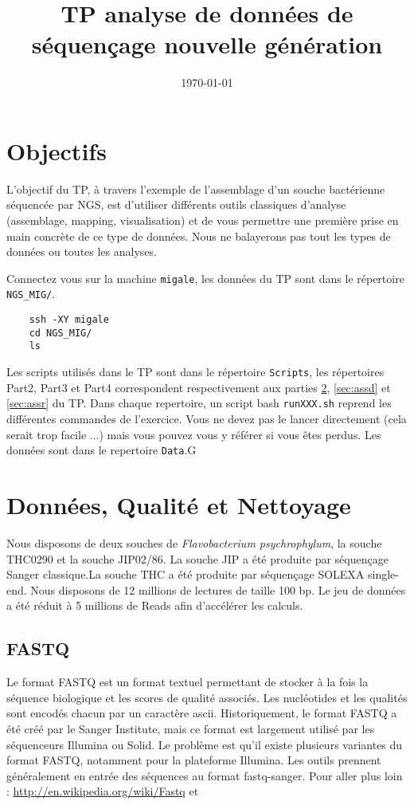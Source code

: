 \documentclass[a4paper,12pt]{article}
\title{TP analyse de données de séquençage nouvelle génération}
\date{\today}
\begin{document}
 

\maketitle 
\section{Objectifs} 
L'objectif du TP, à travers l'exemple de l'assemblage d'un souche bactérienne séquencée par NGS, est d'utiliser différents outils classiques d'analyse (assemblage, mapping, visualisation) et de vous permettre une première prise en main concrète de ce type de données. Nous ne balayerons pas tout les types de données ou toutes les analyses.

Connectez vous sur la machine \verb=migale=, les données du TP sont dans le répertoire \verb=NGS_MIG/=.
\begin{lstlisting}
	ssh -XY migale
	cd NGS_MIG/
	ls
\end{lstlisting}



Les scripts utilisés dans le TP sont dans le répertoire \verb=Scripts=, les répertoires Part2, Part3 et Part4 correspondent respectivement aux parties \ref{sec:qual}, \ref{sec:assd} et \ref{sec:assr} du TP. Dans chaque repertoire, un script bash \verb=runXXX.sh= reprend les différentes commandes de l'exercice. Vous ne devez pas le lancer directement (cela serait trop facile ...) mais vous pouvez vous y référer si vous êtes perdus. Les données sont dans le repertoire \verb=Data=.G


\section{Données, Qualité et Nettoyage}
\label{sec:qual}
Nous disposons de deux souches de \textit{Flavobacterium psychrophylum}, la souche THC0290 et la souche JIP02/86. La souche JIP a été produite par séquençage Sanger classique.La souche THC a été produite par séquençage SOLEXA single-end. Nous disposons de 12 millions de lectures de taille 100 bp. Le jeu de données a été réduit à 5 millions de Reads afin d'accélérer les calculs.

\subsection{FASTQ}
\label{sec:fastq}
Le format FASTQ est un format textuel permettant de stocker à la fois la séquence biologique et les scores de qualité associés. Les nucléotides et les qualités sont encodés chacun par un caractère ascii. Historiquement, le format FASTQ a été créé par le Sanger Institute, mais ce format est largement utilisé par les séquenceurs Illumina ou Solid. Le problème est qu'il existe plusieurs variantes du format FASTQ, notamment pour la plateforme Illumina. Les outils prennent généralement en entrée des séquences au format fastq-sanger.
Pour aller plus loin : \url{http://en.wikipedia.org/wiki/Fastq} et \cite{Cock:2009p1945} 
\end{document}
